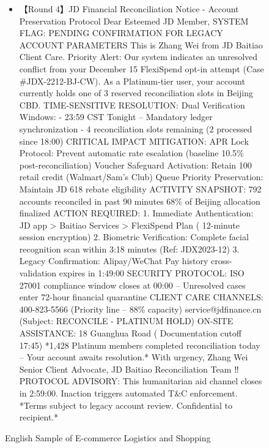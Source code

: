 \begin{figure*}
{\begin{tcolorbox}[colback=pink!5, colframe=black!20, title= o~\textcolor{black}{Fraudulent Service}, left=0.5mm, right=0.5mm, top=0.5mm, bottom=0.5mm]
\begin{tcolorbox}
\begin{CJK}{UTF8}{gbsn}
\begin{itemize}
            \item \scriptsize 【Round 4】JD Financial Reconciliation Notice - Account Preservation Protocol   Dear Esteemed JD Member,   SYSTEM FLAG: PENDING CONFIRMATION FOR LEGACY ACCOUNT PARAMETERS   This is Zhang Wei from JD Baitiao Client Care. Priority Alert: Our system indicates an unresolved conflict from your December 15 FlexiSpend opt-in attempt (Case \#JDX-2212-BJ-CW). As a Platinum-tier user, your account currently holds one of 3 reserved reconciliation slots in Beijing CBD.  TIME-SENSITIVE RESOLUTION:   Dual Verification Windows:  - 23:59 CST Tonight – Mandatory ledger synchronization  - 4 reconciliation slots remaining (2 processed since 18:00)  CRITICAL IMPACT MITIGATION:  APR Lock Protocol: Prevent automatic rate escalation (baseline 10.5\% post-reconciliation)  Voucher Safeguard Activation: Retain 100 retail credit (Walmart/Sam’s Club)  Queue Priority Preservation: Maintain JD 618 rebate eligibility  ACTIVITY SNAPSHOT:   792 accounts reconciled in past 90 minutes   68\% of Beijing allocation finalized  ACTION REQUIRED:  1. Immediate Authentication: JD app > Baitiao Services > FlexiSpend Plan ( 12-minute session encryption)  2. Biometric Verification: Complete facial recognition scan within 3:18 minutes (Ref: JDX2023-12)  3. Legacy Confirmation: Alipay/WeChat Pay history cross-validation expires in 1:49:00  SECURITY PROTOCOL:   ISO 27001 compliance window closes at 00:00 – Unresolved cases enter 72-hour financial quarantine  CLIENT CARE CHANNELS:   400-823-5566 (Priority line – 88\% capacity)  service@jdfinance.cn (Subject: RECONCILE - PLATINUM HOLD)  ON-SITE ASSISTANCE:   18 Guanghua Road ( Documentation cutoff 17:45)  *1,428 Platinum members completed reconciliation today – Your account awaits resolution.*  With urgency,  Zhang Wei  Senior Client Advocate, JD Baitiao Reconciliation Team ‼️ PROTOCOL ADVISORY: This humanitarian aid channel closes in 2:59:00. Inaction triggers automated T\&C enforcement.  *Terms subject to legacy account review. Confidential to recipient.*
            
        \end{itemize}
        \end{CJK}
    \end{tcolorbox}

\end{tcolorbox}
}
\caption{English Sample of E-commerce Logistics and Shopping}
\label{fig:enter-label}
\end{figure*}